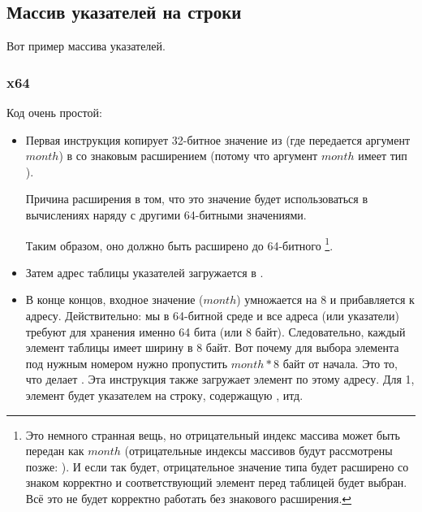 ﻿\subsection{Массив указателей на строки}
\label{array_of_pointers_to_strings}

Вот пример массива указателей.



\subsubsection{x64}



Код очень простой:

\begin{itemize}

\item
{}
Первая инструкция  копирует 32-битное значение из \ECX (где передается аргумент $month$)
в \RAX со знаковым расширением (потому что аргумент $month$ имеет тип \Tint).

Причина расширения в том, что это значение будет использоваться в вычислениях наряду с другими 64-битными
значениями.

Таким образом, оно должно быть расширено до 64-битного
\footnote{Это немного странная вещь, но отрицательный индекс массива может быть передан как $month$ 
(отрицательные индексы массивов будут рассмотрены позже: ).
И если так будет, отрицательное значение типа \Tint будет расширено со знаком корректно
и соответствующий элемент перед таблицей будет выбран.
Всё это не будет корректно работать без знакового расширения.}.

\item
Затем адрес таблицы указателей загружается в \RCX.

\item
В конце концов, входное значение ($month$) умножается на 8 и прибавляется к адресу.
Действительно: мы в 64-битной среде и все адреса (или указатели) 
требуют для хранения именно 64 бита (или 8 байт).
Следовательно, каждый элемент таблицы имеет ширину в 8 байт.
Вот почему для выбора элемента под нужным номером нужно пропустить $month*8$ байт от начала.
Это то, что делает \MOV.
Эта инструкция также загружает элемент по этому адресу.
Для 1, элемент будет указателем на строку, содержащую , итд.

\end{itemize}


